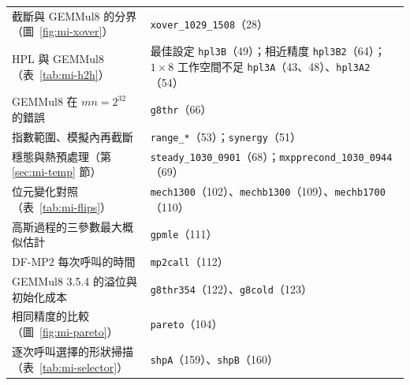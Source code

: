 {\begin{longtable}{@{}>{\raggedright\arraybackslash}p{6.2cm}>{\raggedright\arraybackslash}p{\dimexpr\textwidth-6.2cm-2\tabcolsep\relax}@{}}
截斷與 GEMMul8 的分界（圖~\ref{fig:mi-xover}） & \texttt{xover\_1029\_1508}（28） \\
HPL 與 GEMMul8（表~\ref{tab:mi-h2h}） & 最佳設定 \texttt{hpl3B}（49）；相近精度 \texttt{hpl3B2}（64）；$1\times8$ 工作空間不足 \texttt{hpl3A}（43、48）、\texttt{hpl3A2}（54） \\
GEMMul8 在 $mn=2^{32}$ 的錯誤 & \texttt{g8thr}（66） \\
指數範圍、模擬內再截斷 & \texttt{range\_*}（53）；\texttt{synergy}（51） \\
穩態與熱預處理（第 \ref{sec:mi-temp} 節） & \texttt{steady\_1030\_0901}（68）；\texttt{mxpprecond\_1030\_0944}（69） \\
位元變化對照（表~\ref{tab:mi-flips}） & \texttt{mech1300}（102）、\texttt{mechb1300}（109）、\texttt{mechb1700}（110） \\
高斯過程的三參數最大概似估計 & \texttt{gpmle}（111） \\
DF-MP2 每次呼叫的時間 & \texttt{mp2call}（112） \\
GEMMul8 3.5.4 的溢位與初始化成本 & \texttt{g8thr354}（122）、\texttt{g8cold}（123） \\
相同精度的比較（圖~\ref{fig:mi-pareto}） & \texttt{pareto}（104） \\
逐次呼叫選擇的形狀掃描（表~\ref{tab:mi-selector}） & \texttt{shpA}（159）、\texttt{shpB}（160） \\
\end{longtable}
\par}

